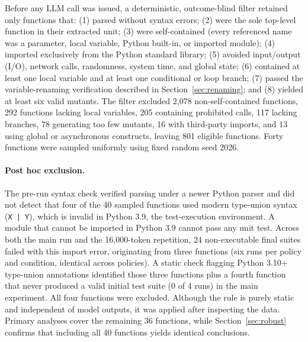 \documentclass[11pt,a4paper]{article}
\begin{document}
Before any LLM call was issued, a deterministic, outcome-blind filter retained only functions that: (1) parsed without syntax errors; (2) were the sole top-level function in their extracted unit; (3) were self-contained (every referenced name was a parameter, local variable, Python built-in, or imported module); (4) imported exclusively from the Python standard library; (5) avoided input/output (I/O), network calls, randomness, system time, and global state; (6) contained at least one local variable and at least one conditional or loop branch; (7) passed the variable-renaming verification described in Section~\ref{sec:renaming}; and (8) yielded at least six valid mutants. The filter excluded 2{,}078 non-self-contained functions, 292 functions lacking local variables, 205 containing prohibited calls, 117 lacking branches, 78 generating too few mutants, 16 with third-party imports, and 13 using global or asynchronous constructs, leaving 801 eligible functions. Forty functions were sampled uniformly using fixed random seed 2026.

\paragraph{Post hoc exclusion.}
The pre-run syntax check verified parsing under a newer Python parser and did not detect that four of the 40 sampled functions used modern type-union syntax (\texttt{X | Y}), which is invalid in Python 3.9, the test-execution environment. A module that cannot be imported in Python 3.9 cannot pass any unit test. Across both the main run and the 16{,}000-token repetition, 24 non-executable final suites failed with this import error, originating from three functions (six runs per policy and condition, identical across policies). A static check flagging Python 3.10+ type-union annotations identified those three functions plus a fourth function that never produced a valid initial test suite (0 of 4 runs) in the main experiment. All four functions were excluded. Although the rule is purely static and independent of model outputs, it was applied after inspecting the data. Primary analyses cover the remaining 36 functions, while Section~\ref{sec:robust} confirms that including all 40 functions yields identical conclusions.
\end{document}
